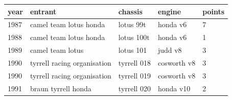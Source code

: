 \documentclass{article}
\begin{document}
\begin{tabular}{lllll}
\toprule
year & entrant & chassis & engine & points \\
\midrule
1987 & camel team lotus honda & lotus 99t & honda v6 & 7 \\
1988 & camel team lotus honda & lotus 100t & honda v6 & 1 \\
1989 & camel team lotus & lotus 101 & judd v8 & 3 \\
1990 & tyrrell racing organisation & tyrrell 018 & cosworth v8 & 3 \\
1990 & tyrrell racing organisation & tyrrell 019 & cosworth v8 & 3 \\
1991 & braun tyrrell honda & tyrrell 020 & honda v10 & 2 \\
\bottomrule
\end{tabular}
\end{document}
